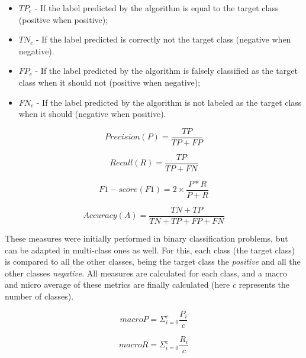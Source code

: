 \begin{itemize}
    \item $TP_c$ - If the label predicted by the algorithm is equal to the target class (positive when positive);
    
    \item $TN_c$ - If the label predicted is correctly not the target class (negative when negative).

    \item $FP_c$ - If the label predicted by the algorithm is falsely classified as the target class when it should not (positive when negative);
    
    \item $FN_c$ - If the label predicted by the algorithm is not labeled as the target class when it should (negative when positive).
    
\end{itemize}


\begin{equation}
\label{eq:precision}
Precision (P) = \frac{TP}{TP+FP}
\end{equation}

\begin{equation}
\label{eq:recall}
Recall (R) = \frac{TP}{TP+FN}
\end{equation}

\begin{equation}
\label{eq:f1_score}
F1-score (F1) = 2 \times \frac{P*R}{P+R}
\end{equation}

\begin{equation}
\label{eq:accuracy}
Accuracy (A) = \frac{TN+TP}{TN+TP+FP+FN}
\end{equation}

These measures were initially performed in binary classification problems, but can be adapted in multi-class ones as well. For this, each class (the target class) is compared to all the other classes, being the target class the \textit{positive} and all the other classes \textit{negative}. All measures are calculated for each class, and a macro and micro average of these metrics are finally calculated (here $c$ represents the number of classes).

\begin{equation}
macroP = \Sigma_{i=0}^c \frac{P_i}{c}
\end{equation}

\begin{equation}
macroR = \Sigma_{i=0}^c \frac{R_i}{c}
\end{equation}

